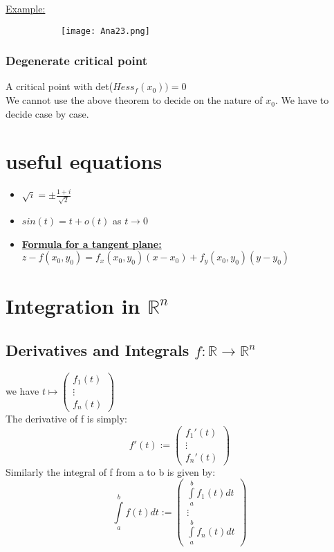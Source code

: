\documentclass[8pt]{extreport}
\newcommand{\R}{\mathbb{R}}
\begin{document}
\underline{Example:}
\begin{figure}[H]
\centering
\begin{subfigure}[b]{0.4\linewidth}
\texttt{[image: Ana23.png]}
\end{subfigure}
\end{figure}

\subsection{Degenerate critical point}

A critical point with det($Hess_f(x_0))=0$\\
We cannot use the above theorem to decide on the nature of $x_0$. We have to decide case by case.









\chapter{useful equations}

\begin{itemize}
\item $\sqrt{i} = \pm \frac{1+i}{\sqrt{2}}$
\item $sin(t) = t + o(t)$ as $t \to 0$
\item \underline{\textbf{Formula for a tangent plane:}} $z-f(x_0,y_0) = f_x(x_0,y_0)(x-x_0) + f_y(x_0,y_0)(y-y_0)$
\end{itemize}


\chapter{Integration in $\R^n$}

\section{Derivatives and Integrals $f: \R \to \R^n$}

we have $t \mapsto \begin{pmatrix} f_1(t) \\ \vdots \\ f_n(t) \end{pmatrix}$\\
The derivative of f is simply:
$$ f'(t) :=\begin{pmatrix} f_1'(t) \\ \vdots \\ f_n'(t) \end{pmatrix}$$
Similarly the integral of f from a to b is given by:
$$\int\limits_a^bf(t)dt:= \begin{pmatrix} \int\limits_a^bf_1(t)dt \\ \vdots \\ \int\limits_a^bf_n(t)dt \end{pmatrix}$$  
\end{document}
